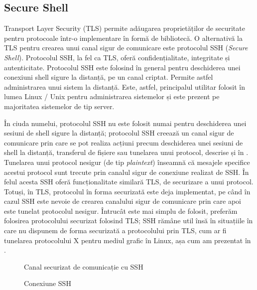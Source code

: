 \subsection{Secure Shell}
\label{sec:sec:transfer:ssh}

Transport Layer Security (TLS) permite adăugarea proprietăților de securitate pentru protocoale într-o implementare în formă de bibliotecă.
O alternativă la TLS pentru crearea unui canal sigur de comunicare este protocolul SSH (\textit{Secure Shell}).
Protocolul SSH, la fel ca TLS, oferă confidențialitate, integritate și autenticitate.
Protocolul SSH este folosind în general pentru deschiderea unei conexiuni shell sigure la distanță, pe un canal criptat.
Permite astfel administrarea unui sistem la distanță.
Este, astfel, principalul utilitar folosit în lumea Linux / Unix pentru administrarea sistemelor și este prezent pe majoritatea sistemelor de tip server.

În ciuda numelui, protocolul SSH nu este folosit numai pentru deschiderea unei sesiuni de shell sigure la distanță;
protocolul SSH creează un canal sigur de comunicare prin care se pot realiza acțiuni precum deschiderea unei sesiuni de shell la distanță, transferul de fișiere sau tunelarea unui protocol, descrise și în .
Tunelarea unui protocol nesigur (de tip \textit{plaintext}) înseamnă că mesajele specifice acestui protocol sunt trecute prin canalul sigur de conexiune realizat de SSH.
În felul acesta SSH oferă funcționalitate similară TLS, de securizare a unui protocol.
Totuși, în TLS, protocolul în forma securizată este deja implementat, pe când în cazul SSH este nevoie de crearea canalului sigur de comunicare prin care apoi este tunelat protocolul nesigur.
Întrucât este mai simplu de folosit, preferăm folosirea protocolului securizat folosind TLS;
SSH rămâne util însă în situațiile în care nu dispunem de forma securizată a protocolului prin TLS, cum ar fi tunelarea protocolului X pentru mediul grafic în Linux, așa cum am prezentat în .

\begin{figure}[htbp]
  \centering
  \def\svgwidth{\columnwidth}
  
  \caption{Canal securizat de comunicație cu SSH}
  \label{fig:sec:ssh-channel}
\end{figure}

\begin{figure}[htbp]
  \centering
  \def\svgwidth{\columnwidth}
  
  \caption{Conexiune SSH}
  \label{fig:sec:ssh-session}
\end{figure}

